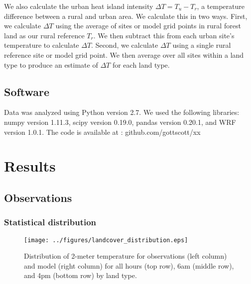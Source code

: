 \documentclass[draft,linenumbers]{agujournal}
\begin{document}
We also calculate the urban heat island intensity $\Delta T = T_u - T_r$, a temperature difference between a rural and urban area. We calculate this in two ways. First, we calculate $\Delta T$ using the average of sites or model grid points in rural forest land as our rural reference $T_r$. We then subtract this from each urban site's temperature to calculate $\Delta T$. 
Second, we calculate $\Delta T$ using a single rural reference site or model grid point. We then average over all sites within a land type to produce an estimate of $\Delta T$ for each land type. 

\subsection{Software}
Data was analyzed using Python version 2.7. We used the following libraries: numpy version 1.11.3, scipy version 0.19.0, pandas version 0.20.1, and WRF version 1.0.1. 
The code is available at :  github.com/gottscott/xx

\section{Results}\label{sec:results} 
\subsection{Observations}
\label{sec:results_obs}
\subsubsection{Statistical distribution}

\begin{figure}
\centering
\texttt{[image: ../figures/landcover\_distribution.eps]}
\caption{Distribution of 2-meter temperature for observations (left column) and model (right column) for all hours (top row), 6am (middle row), and 4pm (bottom row) by land type. }
\label{fig:hist}
\end{figure}
\end{document}
